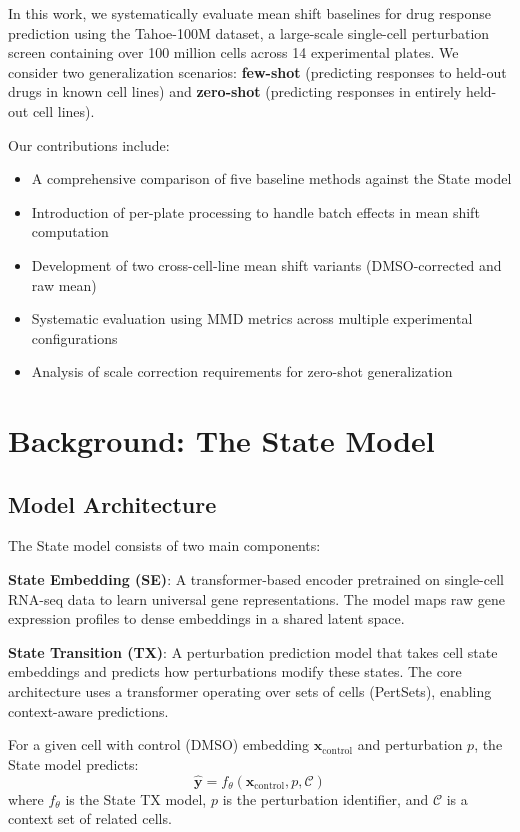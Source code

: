 \documentclass[conference]{IEEEtran}
\begin{document}
In this work, we systematically evaluate mean shift baselines for drug response prediction using the Tahoe-100M dataset, a large-scale single-cell perturbation screen containing over 100 million cells across 14 experimental plates. We consider two generalization scenarios: \textbf{few-shot} (predicting responses to held-out drugs in known cell lines) and \textbf{zero-shot} (predicting responses in entirely held-out cell lines).

Our contributions include:
\begin{itemize}
    \item A comprehensive comparison of five baseline methods against the State model
    \item Introduction of per-plate processing to handle batch effects in mean shift computation
    \item Development of two cross-cell-line mean shift variants (DMSO-corrected and raw mean)
    \item Systematic evaluation using MMD metrics across multiple experimental configurations
    \item Analysis of scale correction requirements for zero-shot generalization
\end{itemize}

\section{Background: The State Model}

\subsection{Model Architecture}

The State model consists of two main components:

\textbf{State Embedding (SE)}: A transformer-based encoder pretrained on single-cell RNA-seq data to learn universal gene representations. The model maps raw gene expression profiles to dense embeddings in a shared latent space.

\textbf{State Transition (TX)}: A perturbation prediction model that takes cell state embeddings and predicts how perturbations modify these states. The core architecture uses a transformer operating over sets of cells (PertSets), enabling context-aware predictions.

For a given cell with control (DMSO) embedding $\mathbf{x}_{\text{control}}$ and perturbation $p$, the State model predicts:
\begin{equation}
\hat{\mathbf{y}} = f_{\theta}(\mathbf{x}_{\text{control}}, p, \mathcal{C})
\end{equation}
where $f_{\theta}$ is the State TX model, $p$ is the perturbation identifier, and $\mathcal{C}$ is a context set of related cells.
\end{document}
